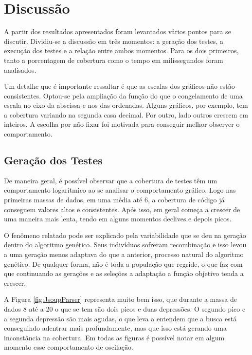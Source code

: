 \section{Discussão \label{sec:discussao}}

A partir dos resultados apresentados foram levantados vários pontos para se discutir. Dividiu-se a discussão em três momentos: a geração dos testes, a execução dos testes e a relação entre ambos momentos. Para os dois primeiros, tanto a porcentagem de cobertura como o tempo em milissegundos foram analisados. 

Um detalhe que é importante ressaltar é que as escalas dos gráficos não estão consistentes. Optou-se pela ampliação da função do que o congelamento de uma escala no eixo da abscissa e nos das ordenadas. Alguns gráficos, por exemplo, tem a cobertura variando na segunda casa decimal. Por outro, lado outros crescem em inteiros. A escolha por não fixar foi motivada para conseguir melhor observer o comportamento.

\subsection{Geração dos Testes}

De maneira geral, é possível observar que a cobertura de testes têm um comportamento logarítmico ao se analisar o comportamento gráfico. Logo nas primeiras massas de dados, em uma média até 6, a cobertura de código já conseguem valores altos e consistentes. Após isso, em geral começa a crescer de uma maneira mais lenta, tendo em alguns momentos declives e depois picos. 

O fenômeno relatado pode ser explicado pela variabilidade que se deu na geração dentro do algoritmo genético. Seus indivíduos sofreram recombinação e isso levou a uma geração menos adaptava do que a anterior, processo natural do algoritmo genético. De qualquer forma, não é toda a população que regride, o que faz com que continuando as gerações e as seleções a adaptação a função objetivo tenda a crescer. 

A Figura \ref{fig:JsoupParser} representa muito bem isso, que durante a massa de dados 8 até a 20 o que se tem são dois picos e duas depressões. O segundo pico e a segunda depressão são mais agudas, o que leva a entendem que a busca está conseguindo adentrar mais profundamente, mas que isso está gerando uma inconstância na cobertura. Em todas as figuras é possível notar em algum momento esse comportamento de oscilação.

